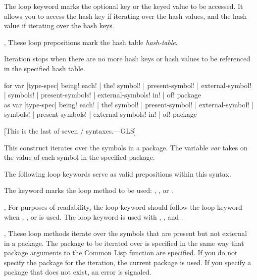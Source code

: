 \begin{new}
\begin{defloop}
\begin{flushdesc}
\item[\cd{using}]
The loop keyword  marks the optional key or the keyed value to
be accessed.  It allows you to access the hash key if
iterating over the hash values, and the hash value if
iterating over the hash keys.

\item[\cd{in}, \cd{of}]
These loop prepositions mark the hash table {\it hash-table}.
\end{flushdesc}

Iteration stops when there are no more hash keys or hash values to be
referenced in the specified hash table.
\end{defloop}


\begin{defloop}
for var [type-spec] \!being! {\!each! | \!the!}
                    {\!symbol! | \!present-symbol! | \!external-symbol! |
                     \!symbols! | \!present-symbols! | \!external-symbols!}
                    {\!in! | \!of!} package \\
as var [type-spec] \!being! {\!each! | \!the!}
                    {\!symbol! | \!present-symbol! | \!external-symbol! |
                     \!symbols! | \!present-symbols! | \!external-symbols!}
                    {\!in! | \!of!} package

[This is the last of seven / syntaxes.---GLS]


This construct iterates over the symbols in a package.
The variable {\it var\/} takes on the value of each symbol
in the specified package.  

The following loop keywords serve as valid prepositions within this syntax.

\begin{flushdesc}

\item[\cd{being}]
The keyword  marks the loop method to be used:
, ,  or .

\item[\cd{each}, \cd{the}]
For purposes of readability, the loop keyword 
should follow the loop keyword  when , 
, or  is used.  The loop keyword
 is used with , , and 
.

\item[\cd{present-symbol}, \cd{present-symbols}]
These loop methods iterate over the symbols that are present but not
external in a package.
The package to be iterated over is
specified in the same way that package arguments to the Common Lisp function
 are specified.  If you do not specify the package 
for the iteration, the current package is used.  If you specify a 
package that does not exist, an error is signaled.


\end{flushdesc}
\end{defloop}
\end{new}
